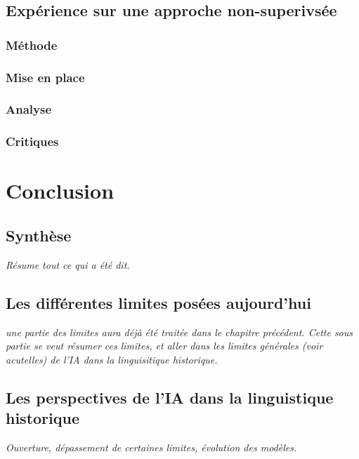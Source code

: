 \documentclass[12pt, french, twoside]{report}
\begin{document}
\section{Expérience sur une approche non-superivsée}
\subsection{Méthode}
\subsection{Mise en place}

\subsection{Analyse}
\subsection{Critiques}

\chapter{Conclusion}
\section{Synthèse}
\textit{Résume tout ce qui a été dit.}
\section{Les différentes limites posées aujourd'hui}
\textit{une partie des limites aura déjà été traitée dans le chapitre précédent. Cette sous partie se veut résumer ces limites, et aller dans les limites générales (voir acutelles) de l'IA dans  la linguisitique historique.}
\section{Les perspectives de l'IA dans la linguistique historique}
\textit{Ouverture, dépassement de certaines limites, évolution des modèles.}

\printbibliography[heading=bibintoc]
\end{document}
